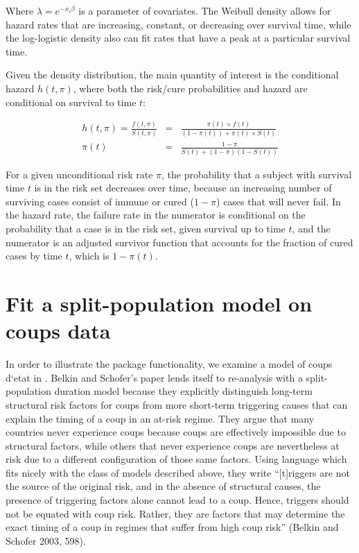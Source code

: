 \documentclass[12pt,onesided]{amsart}
\begin{document}
Where \(\lambda = e^{-x_i\beta}\) is a parameter of covariates. The
Weibull density allows for hazard rates that are increasing, constant,
or decreasing over survival time, while the log-logistic density also
can fit rates that have a peak at a particular survival time.

Given the density distribution, the main quantity of interest is the
conditional hazard \(h(t, \pi)\), where both the risk/cure probabilities
and hazard are conditional on survival to time \(t\):

\begin{eqnarray}
h(t, \pi) = \frac{f(t, \pi)}{S(t, \pi)} & = & \frac{ \pi(t) \times f(t) }{ (1-\pi(t)) + \pi(t) \times S(t) } \\
 \pi(t) & = & \frac{ 1-\pi }{ S(t) + (1-\pi) (1 - S(t)) }
\end{eqnarray}

For a given unconditional risk rate \(\pi\), the probability that a
subject with survival time \(t\) is in the risk set decreases over time,
because an increasing number of surviving cases consist of immune or
cured (\(1-\pi\)) cases that will never fail. In the hazard rate, the
failure rate in the numerator is conditional on the probability that a
case is in the risk set, given survival up to time \(t\), and the
numerator is an adjusted survivor function that accounts for the
fraction of cured cases by time \(t\), which is \(1-\pi(t)\).

\section{Fit a split-population model on coups
data}

In order to illustrate the package functionality, we examine a model of
coups d`etat in \citet{belkin2003toward}. Belkin and Schofer's paper
lends itself to re-analysis with a split-population duration model
because they explicitly distinguish long-term structural risk factors
for coups from more short-term triggering causes that can explain the
timing of a coup in an at-risk regime. They argue that many countries
never experience coups because coups are effectively impossible due to
structural factors, while others that never experience coups are
nevertheless at risk due to a different configuration of those same
factors. Using language which fits nicely with the class of models
described above, they write ``{[}t{]}riggers are not the source of the
original risk, and in the absence of structural causes, the presence of
triggering factors alone cannot lead to a coup. Hence, triggers should
not be equated with coup risk. Rather, they are factors that may
determine the exact timing of a coup in regimes that suffer from high
coup risk'' (Belkin and Schofer 2003, 598).
\end{document}
